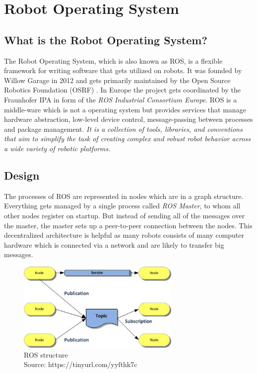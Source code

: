 
\chapter{Robot Operating System\authorA}

\section{What is the Robot Operating System?}
The Robot Operating System, which is also known as ROS, is a flexible framework for writing software that gets utilized on robots. It was founded by Willow Garage in 2012 and gets primarily maintained by the Open Source Robotics Foundation (OSRF) \cite{osrf}. In Europe the project gets coordinated by the Fraunhofer IPA in form of the \textit{ROS Industrial Consortium Europe}. ROS is a middle-ware which is not a operating system but provides services that manage hardware abstraction, low-level device control, message-passing between processes and package management. \emph{\glqq It is a collection of tools, libraries, and conventions that aim to simplify the task of creating complex and robust robot behavior across a wide variety of robotic platforms.\grqq}~\cite{aboutros}

\section{Design}
The processes of ROS are represented in nodes which are in a graph structure. Everything gets managed by a single process called \textit{ROS Master}, to whom all other nodes register on startup. But instead of sending all of the messages over the master, the master sets up a peer-to-peer connection between the nodes. This decentralized architecture is helpful as many robots consists of many computer hardware which is connected via a network and are likely to transfer big messages. \cite{rosoneoone}   \\
\begin{figure}[h]
	\centering
	\includegraphics[width=0.7\textwidth]{./media/images/ros_structure.jpg}
  	\caption{ROS structure
  	\\Source: https://tinyurl.com/yyfthk7c}
  	\label{rosstructure}
\end{figure}

